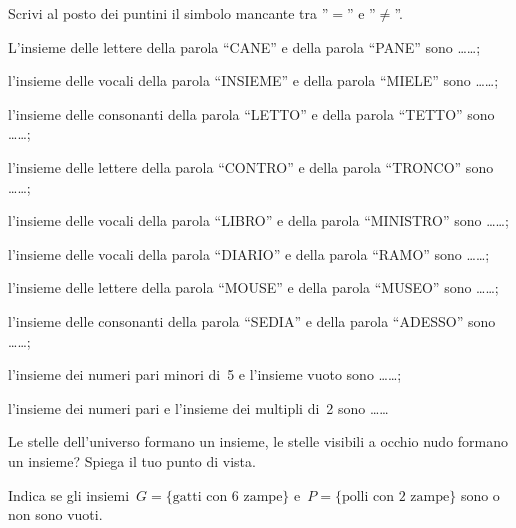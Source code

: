 \begin{esercizio}
\label{ese:5.8}
Scrivi al posto dei puntini il simbolo mancante tra ''$=$'' e ''${\neq}$''.
\begin{enumeratea}
\item L'insieme delle lettere della parola ``CANE'' e della parola ``PANE'' sono 
\ldots\ldots;
\item l'insieme delle vocali della parola ``INSIEME'' e della parola ``MIELE'' 
sono \ldots\ldots;
\item l'insieme delle consonanti della parola ``LETTO'' e della parola ``TETTO'' 
sono \ldots\ldots;
\item l'insieme delle lettere della parola ``CONTRO'' e della parola ``TRONCO'' 
sono \ldots\ldots;
\item l'insieme delle vocali della parola ``LIBRO'' e della parola ``MINISTRO'' 
sono \ldots\ldots;
\item l'insieme delle vocali della parola ``DIARIO'' e della parola ``RAMO'' 
sono \ldots\ldots;
\item l'insieme delle lettere della parola ``MOUSE'' e della parola ``MUSEO'' 
sono \ldots\ldots;
\item l'insieme delle consonanti della parola ``SEDIA'' e della parola 
``ADESSO'' sono \ldots\ldots;
\item l'insieme dei numeri pari minori di~5 e l'insieme vuoto sono \ldots\ldots;
\item l'insieme dei numeri pari e l'insieme dei multipli di~2 sono \ldots\ldots
\end{enumeratea}
\end{esercizio}

\begin{esercizio}
\label{ese:5.9}
Le stelle dell'universo formano un insieme, le stelle visibili a occhio nudo 
formano un insieme? Spiega il tuo punto di vista.
\end{esercizio}


\begin{esercizio}
\label{ese:5.10}
Indica se gli insiemi~$G =\text{\{gatti con~6 zampe\}}$ e~$P = \text{\{polli 
con~2 zampe\}}$ sono o non sono vuoti.
\end{esercizio}


